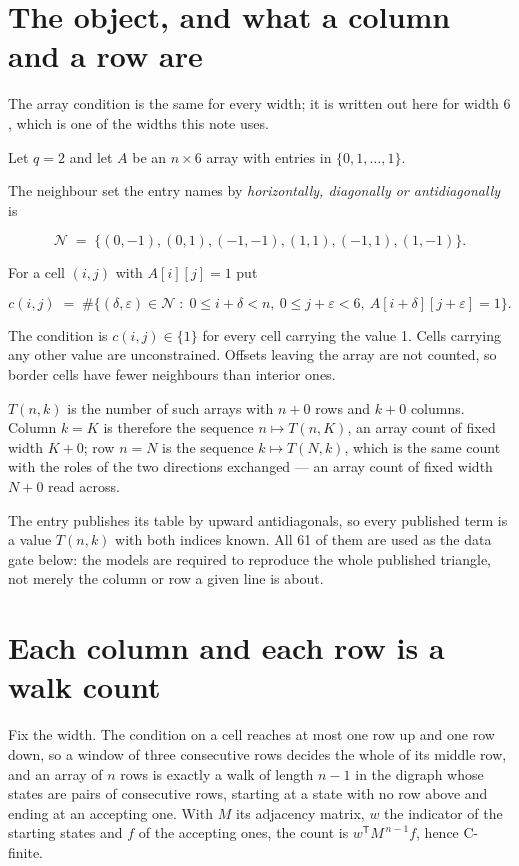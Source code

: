 \documentclass[11pt]{article}
\theoremstyle{definition}
\begin{document}
\section{The object, and what a column and a row are}

The array condition is the same for every width; it is written out here for width $6$, which is one of the widths this note uses.

Let $q = 2$ and let $A$ be an $n \times 6$ array with entries in $\{0,1,\dots,1\}$.

The neighbour set the entry names by {\itshape horizontally, diagonally or antidiagonally} is

\[\mathcal{N} \;=\; \{(0,-1), (0,1), (-1,-1), (1,1), (-1,1), (1,-1)\}.\]

For a cell $(i,j)$ with $A[i][j] = 1$ put

\[c(i,j) \;=\; \#\bigl\{(\delta,\varepsilon)\in\mathcal{N} \;:\; 0\le i+\delta<n,\ 0\le j+\varepsilon<6,\ A[i+\delta][j+\varepsilon] = 1\bigr\}.\]

The condition is $c(i,j) \in \{1\}$ for every cell carrying the value 1. Cells carrying any other value are unconstrained. Offsets leaving the array are not counted, so border cells have fewer neighbours than interior ones.

$T(n,k)$ is the number of such arrays with $n + 0$ rows and $k + 0$ columns. Column $k = K$ is therefore the sequence $n \mapsto T(n,K)$, an array count of fixed width $K + 0$; row $n = N$ is the sequence $k \mapsto T(N,k)$, which is the same count with the roles of the two directions exchanged --- an array count of fixed width $N + 0$ read across.

The entry publishes its table by upward antidiagonals, so every published term is a value $T(n,k)$ with both indices known. All 61 of them are used as the data gate below: the models are required to reproduce the whole published triangle, not merely the column or row a given line is about.

\section{Each column and each row is a walk count}

Fix the width. The condition on a cell reaches at most one row up and one row down, so a window of three consecutive rows decides the whole of its middle row, and an array of $n$ rows is exactly a walk of length $n-1$ in the digraph whose states are pairs of consecutive rows, starting at a state with no row above and ending at an accepting one. With $M$ its adjacency matrix, $w$ the indicator of the starting states and $f$ of the accepting ones, the count is $w^{\mathsf T}M^{\,n-1}f$, hence C-finite.
\end{document}
